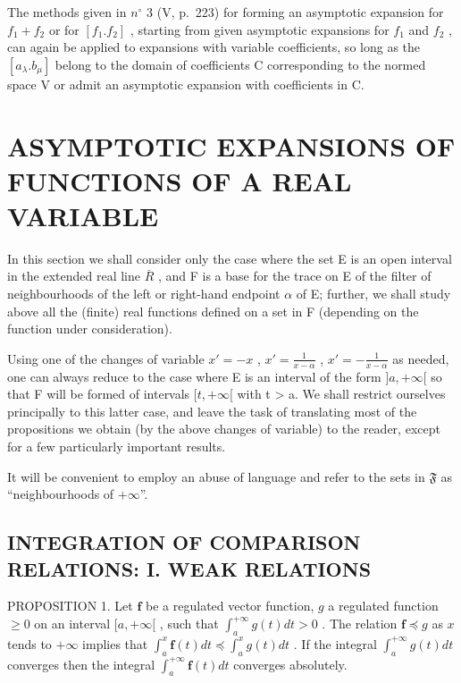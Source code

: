 The methods given in \(n^{\circ}\) 3 (V, p.~223) for forming an asymptotic expansion for \(f_{1} + f_{2}\) or for \([f_{1}.f_{2}]\) , starting from given asymptotic expansions for \(f_{1}\) and \(f_{2}\) , can again be applied to expansions with variable coefficients, so long as the \([a_{\lambda}.b_{\mu}]\) belong to the domain of coefficients C corresponding to the normed space V or admit an asymptotic expansion with coefficients in C.

\section{ASYMPTOTIC EXPANSIONS OF FUNCTIONS OF A REAL VARIABLE}

In this section we shall consider only the case where the set E is an open interval in the extended real line \(\overline{R}\) , and F is a base for the trace on E of the filter of neighbourhoods of the left or right-hand endpoint \(\alpha\) of E; further, we shall study above all the (finite) real functions defined on a set in F (depending on the function under consideration).

Using one of the changes of variable \(x' = -x\) , \(x' = \frac{1}{x - \alpha}\) , \(x' = -\frac{1}{x - \alpha}\) as needed, one can always reduce to the case where E is an interval of the form \(]a, +\infty[\) so that F will be formed of intervals \([t, +\infty[\) with t \textgreater{} a. We shall restrict ourselves principally to this latter case, and leave the task of translating most of the propositions we obtain (by the above changes of variable) to the reader, except for a few particularly important results.

It will be convenient to employ an abuse of language and refer to the sets in \(\mathfrak{F}\) as ``neighbourhoods of \(+\infty\)''.

\subsection{INTEGRATION OF COMPARISON RELATIONS: I. WEAK RELATIONS}

PROPOSITION 1. Let \(\mathbf{f}\) be a regulated vector function, \(g\) a regulated function \(\geqslant 0\) on an interval \([a, +\infty[\) , such that \(\int_{a}^{+\infty} g(t) dt > 0\) . The relation \(\mathbf{f} \preccurlyeq g\) as \(x\) tends to \(+\infty\) implies that \(\int_{a}^{x} \mathbf{f}(t) dt \preccurlyeq \int_{a}^{x} g(t) dt\) . If the integral \(\int_{a}^{+\infty} g(t) dt\) converges then the integral \(\int_{a}^{+\infty} \mathbf{f}(t) dt\) converges absolutely.

